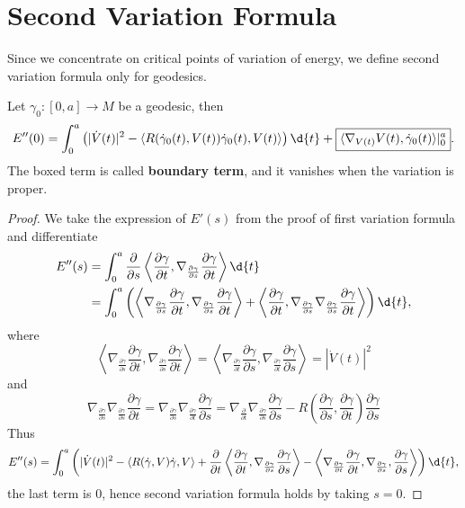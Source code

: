 \section{Second Variation Formula}

Since we concentrate on critical points of variation of energy, we define second variation formula only for geodesics.

\begin{prop}
    Let $\gamma_0:[0,a]\to M$ be a geodesic, then
    \[E''(0)=\int_0^a\left(|\dot{V}(t)|^2-\langle R(\dot{\gamma}_0(t),V(t))\dot{\gamma}_0(t),V(t)\rangle\right)\d{t}+\boxed{\langle\nabla_{V(t)}V(t),\dot{\gamma}_0(t)\rangle|_0^a}.\]
    The boxed term is called \textbf{boundary term}, and it vanishes when the variation is proper.
\end{prop}
\begin{proof}
    We take the expression of $E'(s)$ from the proof of first variation formula and differentiate
    \begin{align*}
        E''(s)&=\int_0^a\frac{\partial{}}{\partial{s}}\left\langle\frac{\partial\gamma}{\partial{t}},\nabla_{\frac{\partial{\gamma}}{\partial{s}}}\frac{\partial\gamma}{\partial{t}}\right\rangle\d{t}\\
        &=\int_0^a\left(\left\langle\nabla_{\frac{\partial{\gamma}}{\partial{s}}}\frac{\partial{\gamma}}{\partial{t}},\nabla_{\frac{\partial{\gamma}}{\partial{s}}}\frac{\partial{\gamma}}{\partial{t}}\right\rangle+\left\langle\frac{\partial\gamma}{\partial{t}},\nabla_{\frac{\partial{\gamma}}{\partial{s}}}\nabla_{\frac{\partial{\gamma}}{\partial{s}}}\frac{\partial{\gamma}}{\partial{t}}\right\rangle\right)\d{t},
    \end{align*}
    where
    \[\left\langle\nabla_{\frac{\partial{\gamma}}{\partial{s}}}\frac{\partial{\gamma}}{\partial{t}},\nabla_{\frac{\partial{\gamma}}{\partial{s}}}\frac{\partial{\gamma}}{\partial{t}}\right\rangle=\left\langle\nabla_{\frac{\partial{\gamma}}{\partial{t}}}\frac{\partial{\gamma}}{\partial{s}},\nabla_{\frac{\partial{\gamma}}{\partial{t}}}\frac{\partial{\gamma}}{\partial{s}}\right\rangle=|\dot{V}(t)|^2\]
    and
    \[\nabla_{\frac{\partial{\gamma}}{\partial{s}}}\nabla_{\frac{\partial{\gamma}}{\partial{s}}}\frac{\partial{\gamma}}{\partial{t}}=\nabla_{\frac{\partial{\gamma}}{\partial{s}}}\nabla_{\frac{\partial{\gamma}}{\partial{t}}}\frac{\partial{\gamma}}{\partial{s}}=\nabla_{\frac{\partial{}}{\partial{t}}}\nabla_{\frac{\partial{\gamma}}{\partial{s}}}\frac{\partial{\gamma}}{\partial{s}}-R\left(\frac{\partial\gamma}{\partial{s}},\frac{\partial\gamma}{\partial{t}}\right)\frac{\partial\gamma}{\partial{s}}\]
    Thus
    \[E''(s)=\int_0^a\left(|\dot{V}(t)|^2-\langle R(\dot{\gamma},V)\dot{\gamma},V\rangle+\frac{\partial{}}{\partial{t}}\left\langle\frac{\partial{\gamma}}{\partial{t}},\nabla_{\frac{\partial\gamma}{\partial{s}}}\frac{\partial{\gamma}}{\partial{s}}\right\rangle-{\left\langle\nabla_{\frac{\partial\gamma}{\partial{t}}}\frac{\partial\gamma}{\partial{t}},\nabla_{\frac{\partial\gamma}{\partial{s}}},\frac{\partial{\gamma}}{\partial{s}}\right\rangle}\right)\d{t},\]
    the last term is $0$, hence second variation formula holds by taking $s=0$.
\end{proof}

